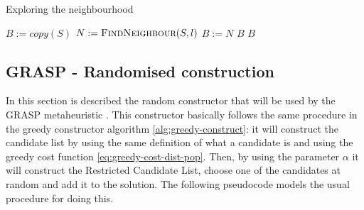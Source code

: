\hfill

\begin{algorithm}[H]
    \label{alg:neighbourhood-exploration}
    \DontPrintSemicolon
    \caption{Exploring the neighbourhood}
    
     {
        $B := copy(S)$\;
        \For {$\iloc \in \loc$} {
            $N := \textsc{FindNeighbour}(S, l)$\;
             {
                $B := N$\;
                 {
                    \Return $B$
                }
            }
        }
        \Return $B$
    }
\end{algorithm}

\hfill

\subsection{GRASP - Randomised construction}
\label{sec:metaheuristics:randomised-construction}

In this section is described the random constructor that will be used by the GRASP
metaheuristic \cite{GRASP}. This constructor basically follows the same procedure in the greedy
constructor algorithm \ref{alg:greedy-construct}: it will construct the candidate list by
using the same definition of what a candidate is and using the greedy cost function
\ref{eq:greedy-cost-dist-pop}. Then, by using the parameter $\alpha$ it will construct the
Restricted Candidate List, choose one of the candidates at random and add it to the solution.
The following pseudocode models the usual procedure for doing this.

\hfill

